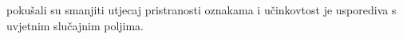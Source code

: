 \cite{cohen05ijcai} pokušali su smanjiti utjecaj pristranosti oznakama i
učinkovtost je usporediva s uvjetnim slučajnim poljima.
